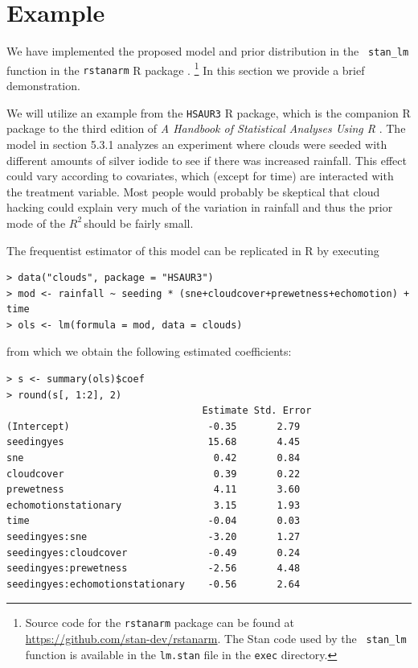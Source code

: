 \documentclass[11pt]{article}
\newcommand{\Rsq}{$R^2\,$}
\begin{document}
\section{Example}
\label{sec:example}


We have implemented the proposed model and prior distribution in the {\tt
stan\_lm} function in the {\tt rstanarm} R package \cite{rstanarm}.%
\footnote{Source code for the {\tt rstanarm} package can be found at
\url{https://github.com/stan-dev/rstanarm}. The Stan code used by the {\tt
stan\_lm} function is available in the {\tt lm.stan} file in the {\tt exec}
directory.}
In this section we provide a brief demonstration.

We will utilize an example from the {\tt HSAUR3} R package, which is the
companion R package to the third edition of \emph{A Handbook of Statistical
Analyses Using R} \cite{HSAUR3-book}. The model in section 5.3.1 analyzes an
experiment where clouds were seeded with different amounts of silver iodide to
see if there was increased rainfall. This effect could vary according to
covariates, which (except for time) are interacted with the treatment variable.
Most people would probably be skeptical that cloud hacking could explain very
much of the variation in rainfall and thus the prior mode of the \Rsq should be
fairly small.

The frequentist estimator of this model can be replicated in R by executing

\vspace{.5cm}
\begin{lstlisting}[frame=lines]
> data("clouds", package = "HSAUR3")
> mod <- rainfall ~ seeding * (sne+cloudcover+prewetness+echomotion) + time
> ols <- lm(formula = mod, data = clouds)
\end{lstlisting}
\vspace{.5cm}

\noindent from which we obtain the following estimated coefficients:

\vspace{.5cm}
\begin{lstlisting}[frame=lines]
> s <- summary(ols)$coef
> round(s[, 1:2], 2)
                                  Estimate Std. Error
(Intercept)                        -0.35       2.79
seedingyes                         15.68       4.45
sne                                 0.42       0.84
cloudcover                          0.39       0.22
prewetness                          4.11       3.60
echomotionstationary                3.15       1.93
time                               -0.04       0.03
seedingyes:sne                     -3.20       1.27
seedingyes:cloudcover              -0.49       0.24
seedingyes:prewetness              -2.56       4.48
seedingyes:echomotionstationary    -0.56       2.64
\end{lstlisting}
\vspace{.5cm}
\end{document}
